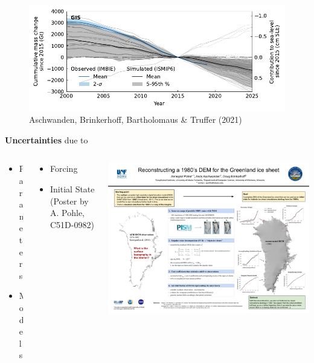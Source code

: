 \documentclass[aspectratio=169,hide notes,intlimits]{beamer}
\begin{document}
  
\begin{frame}[noframenumbering]
    \begin{minipage}[t][5.25cm][t]{\textwidth}
  \begin{figure}
    \includegraphics[width=.75\textwidth]{GIS_historical}\\[-1em]
    {\tiny{Aschwanden, Brinkerhoff, Bartholomaus \& Truffer (2021)}}
  \end{figure}
    \end{minipage}
    \begin{minipage}[t][3.5cm][t]{\textwidth}
    \textbf{Uncertainties} due to
        \begin{columns}[c]
    \begin{column}{.18\textwidth}
\begin{itemize}\setlength\itemsep{.25em}
    \item \alert{Parameters}
    \item Models
\end{itemize}
    \end{column}
    \begin{column}{.4\textwidth}
\begin{itemize}\setlength\itemsep{.25em}
    \item Forcing
    \item Initial State (Poster by A. Pohle, C51D-0982)
\end{itemize}
    \end{column}
    \begin{column}{.25\textwidth}
    \includegraphics[width=.75\textwidth]{pohle_poster_agu_2023}    
    \end{column}
  \end{columns}
    \end{minipage}
\end{frame}
\end{document}
